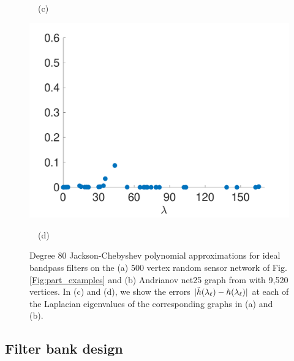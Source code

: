 \documentclass[journal, 10pt]{IEEEtran}
\begin{document}
\begin{figure}[tb]
\begin{minipage}[m]{0.49\linewidth}
\centerline{~~\small{(c)}}
\end{minipage}
\begin{minipage}[m]{0.49\linewidth}
\centerline{\includegraphics[width=.9\linewidth]{fig_approx_filter_net25_error}}
\centerline{~~\small{(d)}}
\end{minipage}
\caption{Degree 80 Jackson-Chebyshev polynomial approximations for ideal bandpass filters on the (a) 500 vertex random sensor network of Fig. \ref{Fig:part_examples} and (b) Andrianov net25 graph from \cite{davis2011university} with 9,520 vertices. In (c) and (d), we show the errors $|\tilde{h}(\lambda_{\ell})-h(\lambda_{\ell})|$ at each of the Laplacian eigenvalues of the corresponding graphs in (a) and (b).}
\label{Fig:approx_filtering_error}
\end{figure}


\subsection{Filter bank design}
\end{document}
